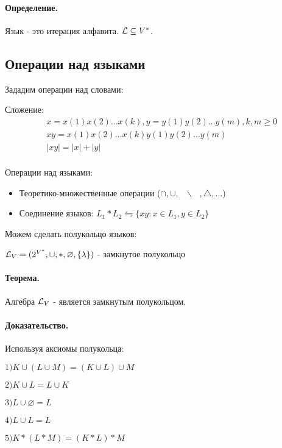 \documentclass{report}
\newcommand{\bslash}{\mbox{ } \backslash \mbox{ }}
\begin{document}
\paragraph*{Определение.}
Язык - это итерация алфавита.
$ {\cal L} \subseteq V^{*}$.

\medskip

\subsection{Операции над языками}
Зададим операции над словами:

Сложение:
\[
\begin{align*}
&x = x(1)x(2)\ldots x(k), y = y(1)y(2)\ldots y(m), k,m \ge 0 \\
&xy = x(1)x(2)\ldots x(k)y(1)y(2)\ldots y(m) \\
&\left| xy \right| =  |x| + |y| \\
\end{align*}
\] 

\medskip

Операции над языками:
\begin{itemize}
	\item Теоретико-множественные операции ($\cap, \cup, \bslash, \triangle,\ldots$)
	\item Соединение языков: $L_1*L_2 \leftrightharpoons
		\{xy:x \in  L_1, y \in  L_2\} $
\end{itemize}

\medskip

Можем сделать полукольцо языков:

$ {\cal L}_{V} = (2^{V^{*}}, \cup, *, \varnothing, \{\lambda\} )$ - замкнутое полукольцо

\paragraph*{Теорема.}
Алгебра $ {\cal L}_{V}$ - является замкнутым полукольцом.
\paragraph*{Доказательство.}
Используя аксиомы полукольца:

$1) K \cup (L \cup M) = (K \cup L) \cup M$

 $2) K\cup L = L \cup K$

  $3) L \cup \varnothing = L$

 $4) L \cup L = L$

  $5) K*(L*M) = (K*L)*M$
\end{document}
